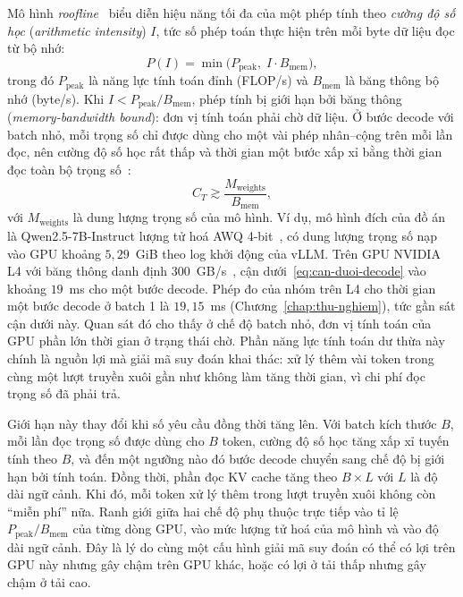 Mô hình \textit{roofline}~\cite{williams2009roofline} biểu diễn hiệu năng tối đa của một phép tính theo \textit{cường độ số học} (\textit{arithmetic intensity}) $I$, tức số phép toán thực hiện trên mỗi byte dữ liệu đọc từ bộ nhớ:
\begin{equation}\label{eq:roofline}
  P(I) = \min\bigl(P_{\text{peak}},\; I \cdot B_{\text{mem}}\bigr),
\end{equation}
trong đó $P_{\text{peak}}$ là năng lực tính toán đỉnh (FLOP/s) và $B_{\text{mem}}$ là băng thông bộ nhớ (byte/s). Khi $I < P_{\text{peak}}/B_{\text{mem}}$, phép tính bị giới hạn bởi băng thông (\textit{memory-bandwidth bound}): đơn vị tính toán phải chờ dữ liệu. Ở bước decode với batch nhỏ, mỗi trọng số chỉ được dùng cho một vài phép nhân--cộng trên mỗi lần đọc, nên cường độ số học rất thấp và thời gian một bước xấp xỉ bằng thời gian đọc toàn bộ trọng số~\cite{pope2023scaling}:
\begin{equation}\label{eq:can-duoi-decode}
  C_T \gtrsim \frac{M_{\text{weights}}}{B_{\text{mem}}},
\end{equation}
với $M_{\text{weights}}$ là dung lượng trọng số của mô hình. Ví dụ, mô hình đích của đồ án là Qwen2.5-7B-Instruct lượng tử hoá AWQ 4-bit~\cite{qwen2024qwen25,lin2024awq}, có dung lượng trọng số nạp vào GPU khoảng $5{,}29$~GiB theo log khởi động của vLLM. Trên GPU NVIDIA L4 với băng thông danh định $300$~GB/s~\cite{nvidia-l4}, cận dưới~\eqref{eq:can-duoi-decode} vào khoảng $19$~ms cho một bước decode. Phép đo của nhóm trên L4 cho thời gian một bước decode ở batch 1 là $19{,}15$~ms (Chương~\ref{chap:thu-nghiem}), tức gần sát cận dưới này. Quan sát đó cho thấy ở chế độ batch nhỏ, đơn vị tính toán của GPU phần lớn thời gian ở trạng thái chờ. Phần năng lực tính toán dư thừa này chính là nguồn lợi mà giải mã suy đoán khai thác: xử lý thêm vài token trong cùng một lượt truyền xuôi gần như không làm tăng thời gian, vì chi phí đọc trọng số đã phải trả.

Giới hạn này thay đổi khi số yêu cầu đồng thời tăng lên. Với batch kích thước $B$, mỗi lần đọc trọng số được dùng cho $B$ token, cường độ số học tăng xấp xỉ tuyến tính theo $B$, và đến một ngưỡng nào đó bước decode chuyển sang chế độ bị giới hạn bởi tính toán. Đồng thời, phần đọc KV cache tăng theo $B \times L$ với $L$ là độ dài ngữ cảnh. Khi đó, mỗi token xử lý thêm trong lượt truyền xuôi không còn ``miễn phí'' nữa. Ranh giới giữa hai chế độ phụ thuộc trực tiếp vào tỉ lệ $P_{\text{peak}}/B_{\text{mem}}$ của từng dòng GPU, vào mức lượng tử hoá của mô hình và vào độ dài ngữ cảnh. Đây là lý do cùng một cấu hình giải mã suy đoán có thể có lợi trên GPU này nhưng gây chậm trên GPU khác, hoặc có lợi ở tải thấp nhưng gây chậm ở tải cao.

